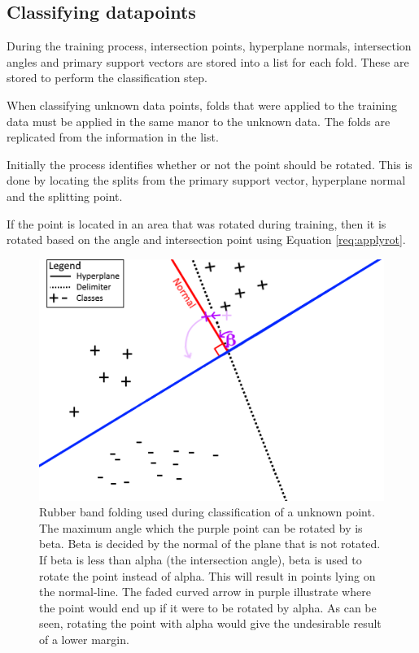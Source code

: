 \documentclass[a4paper,twoside]{bth}
\begin{document}
\subsection{Classifying datapoints}
\par During the training process, intersection points, hyperplane normals, intersection angles and primary support vectors are stored into a list for each fold. These are stored to perform the classification step.
\par When classifying unknown data points, folds that were applied to the training data must be applied in the same manor to the unknown data. The folds are replicated from the information in the list. 
\par Initially the process identifies whether or not the point should be rotated. This is done by locating the splits from the primary support vector, hyperplane normal and the splitting point.
\par If the point is located in an area that was rotated during training, then it is rotated based on the angle and intersection point using Equation \ref{req:applyrot}.



\begin{figure}
\centering
\includegraphics[scale=1]{images/intro-images/rubberbandExplanation3.png}

   \caption{Rubber band folding used during classification of a unknown point. The maximum angle which the purple point can be rotated by is beta. Beta is decided by the normal of the plane that is not rotated. If beta is less than alpha (the intersection angle), beta is used to rotate the point instead of alpha. This will result in points lying on the normal-line. The faded curved arrow in purple illustrate where the point would end up if it were to be rotated by alpha. As can be seen, rotating the point with alpha would give the undesirable result of a lower margin.}
   \label{fig:rbf_classification}
\end{figure}
\end{document}
